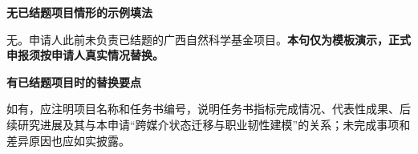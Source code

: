 \GXNSFBodyText

\noindent\textbf{无已结题项目情形的示例填法}\par
无。申请人此前未负责已结题的广西自然科学基金项目。\textbf{本句仅为模板演示，正式申报须按申请人真实情况替换。}

\noindent\textbf{有已结题项目时的替换要点}\par
如有，应注明项目名称和任务书编号，说明任务书指标完成情况、代表性成果、后续研究进展及其与本申请“跨媒介状态迁移与职业韧性建模”的关系；未完成事项和差异原因也应如实披露。
